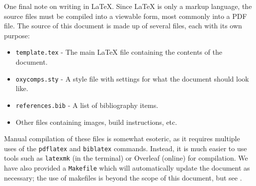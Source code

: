 \documentclass[12pt,twocolumn]{article}
\begin{document}
One final note on writing in LaTeX.
Since LaTeX is only a markup language, the source files must be compiled into a viewable form, most commonly into a PDF file.
The source of this document is made up of several files, each with its own purpose:
\begin{itemize}
    \item \texttt{template.tex} - The main LaTeX file containing the contents of the document.
    \item \texttt{oxycomps.sty} - A style file with settings for what the document should look like.
    \item \texttt{references.bib} - A list of bibliography items.
    \item Other files containing images, build instructions, etc.
\end{itemize}
Manual compilation of these files is somewhat esoteric, as it requires multiple uses of the \texttt{pdflatex} and \texttt{biblatex} commands.
Instead, it is much easier to use tools such as \texttt{latexmk} (in the terminal) or Overleaf (online) for compilation.
We have also provided a \texttt{Makefile} which will automatically update the document as necessary; the use of makefiles is beyond the scope of this document, but see \textcite{Lambert2021MakefileTutorial}.

\end{document}
